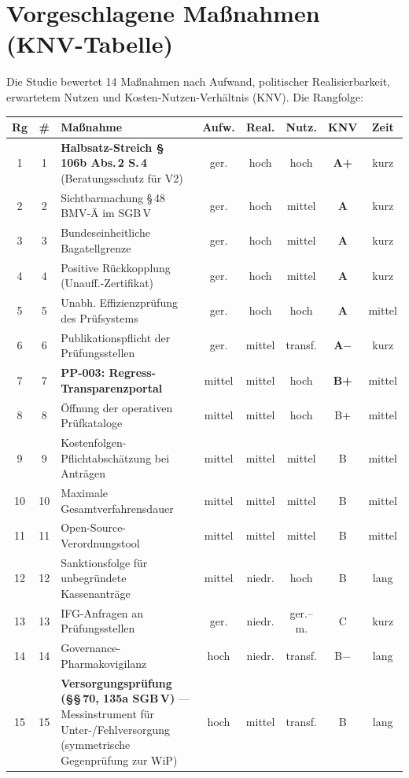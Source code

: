 \documentclass{umbruch-position}
\begin{document}
\section{Vorgeschlagene Ma\ss{}nahmen (KNV-Tabelle)}

Die Studie bewertet 14 Ma\ss{}nahmen nach Aufwand, politischer Realisierbarkeit, erwartetem Nutzen und Kosten-Nutzen-Verh\"altnis (KNV). Die Rangfolge:

\smallskip
{\small
\begin{tabularx}{\textwidth}{c c X c c c c c}
\hline
\textbf{Rg} & \textbf{\#} & \textbf{Ma\ss{}nahme} & \textbf{Aufw.} & \textbf{Real.} & \textbf{Nutz.} & \textbf{KNV} & \textbf{Zeit} \\
\hline
1 & 1 & \textbf{Halbsatz-Streich \S\,106b Abs.\,2 S.\,4} (Beratungsschutz f\"ur V2) & ger. & hoch & hoch & \textbf{A+} & kurz \\
2 & 2 & Sichtbarmachung \S\,48 BMV-\"A im SGB\,V & ger. & hoch & mittel & \textbf{A} & kurz \\
3 & 3 & Bundeseinheitliche Bagatellgrenze & ger. & hoch & mittel & \textbf{A} & kurz \\
4 & 4 & Positive R\"uckkopplung (Unauff.-Zertifikat) & ger. & hoch & mittel & \textbf{A} & kurz \\
5 & 5 & Unabh. Effizienzpr\"ufung des Pr\"ufsystems & ger. & hoch & hoch & \textbf{A} & mittel \\
6 & 6 & Publikationspflicht der Pr\"ufungsstellen & ger. & mittel & transf. & \textbf{A$-$} & kurz \\
7 & 7 & \textbf{PP-003: Regress-Transparenzportal} & mittel & mittel & hoch & \textbf{B+} & mittel \\
8 & 8 & \"Offnung der operativen Pr\"ufkataloge & mittel & mittel & hoch & B+ & mittel \\
9 & 9 & Kostenfolgen-Pflichtabsch\"atzung bei Antr\"agen & mittel & mittel & mittel & B & mittel \\
10 & 10 & Maximale Gesamtverfahrensdauer & mittel & mittel & mittel & B & mittel \\
11 & 11 & Open-Source-Verordnungstool & mittel & mittel & mittel & B & mittel \\
12 & 12 & Sanktionsfolge f\"ur unbegr\"undete Kassenantr\"age & mittel & niedr. & hoch & B & lang \\
13 & 13 & IFG-Anfragen an Pr\"ufungsstellen & ger. & niedr. & ger.--m. & C & kurz \\
14 & 14 & Governance-Pharmakovigilanz & hoch & niedr. & transf. & B$-$ & lang \\
15 & 15 & \textbf{Versorgungspr\"ufung (\S\S\,70, 135a SGB\,V)} --- Messinstrument f\"ur Unter-/Fehlversorgung (symmetrische Gegenpr\"ufung zur WiP) & hoch & mittel & transf. & B & lang \\
\hline
\end{tabularx}
}
\smallskip
\end{document}
